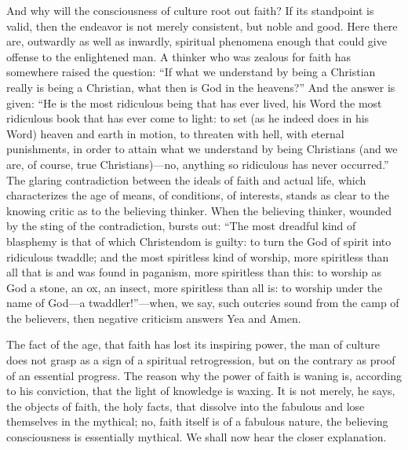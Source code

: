 \documentclass[12pt]{book}
\newcommand{\opage}[1]{\marginnote{\footnotesize\textit{[#1]}}}
\begin{document}
And why will the consciousness of culture root out faith? If its
standpoint is valid, then the endeavor is not merely consistent, but
noble and good. Here there are, outwardly as well as inwardly, spiritual
phenomena enough that could give offense to the enlightened man. A
thinker who was zealous for faith has somewhere raised the question:
``If what we understand by being a Christian really is being a
Christian, what then is God in the heavens?'' And the answer is given:
``He is the most ridiculous being that has ever lived, his Word the most
ridiculous book that has ever come to light: to set (as he indeed does
in his Word) heaven and earth in motion, to threaten with hell, with
eternal punishments, in order to attain what we understand by being
Christians (and we are, of course, true Christians)---no, anything so
ridiculous has never occurred.'' The glaring contradiction between the
ideals of faith and actual life, which characterizes the age of means,
of conditions, of interests,
\opage{92}\setcounter{footnote}{0}%
stands as clear to the knowing critic as to the believing thinker. When
the believing thinker, wounded by the sting of the contradiction, bursts
out: ``The most dreadful kind of blasphemy is that of which Christendom
is guilty: to turn the God of spirit into ridiculous twaddle; and the
most spiritless kind of worship, more spiritless than all that is and
was found in paganism, more spiritless than this: to worship as God a
stone, an ox, an insect, more spiritless than all is: to worship under
the name of God---a twaddler!''---when, we say, such outcries sound from
the camp of the believers, then negative criticism answers Yea and Amen.

The fact of the age, that faith has lost its inspiring power, the man of
culture does not grasp as a sign of a spiritual retrogression, but on
the contrary as proof of an essential progress. The reason why the power
of faith is waning is, according to his conviction, that the light of
knowledge is waxing. It is not merely, he says, the objects of faith,
the holy facts, that dissolve into the fabulous and lose themselves in
the mythical; no, faith itself is of a fabulous nature, the believing
consciousness is essentially mythical. We shall now hear the closer
explanation.
\end{document}
